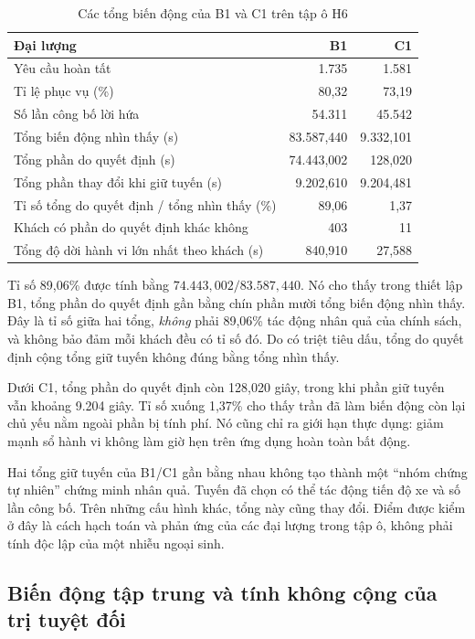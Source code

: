 \begin{table}[htbp]
\centering
\caption{Các tổng biến động của B1 và C1 trên tập ô H6}
\label{bang:quytrach}
\begin{tabularx}{\linewidth}{@{}Xrr@{}}
\toprule
\textbf{Đại lượng} & \textbf{B1} & \textbf{C1}\\
\midrule
Yêu cầu hoàn tất & 1.735 & 1.581\\
Tỉ lệ phục vụ (\%) & 80,32 & 73,19\\
Số lần công bố lời hứa & 54.311 & 45.542\\
Tổng biến động nhìn thấy (s) & 83.587,440 & 9.332,101\\
Tổng phần do quyết định (s) & 74.443,002 & 128,020\\
Tổng phần thay đổi khi giữ tuyến (s) & 9.202,610 & 9.204,481\\
Tỉ số tổng do quyết định / tổng nhìn thấy (\%) & 89,06 & 1,37\\
Khách có phần do quyết định khác không & 403 & 11\\
Tổng độ dời hành vi lớn nhất theo khách (s) & 840,910 & 27,588\\
\bottomrule
\end{tabularx}
\end{table}

Tỉ số 89,06\% được tính bằng $74.443{,}002/83.587{,}440$. Nó cho thấy trong thiết lập
B1, tổng phần do quyết định gần bằng chín phần mười tổng biến động nhìn thấy. Đây là tỉ
số giữa hai tổng, \emph{không} phải 89,06\% tác động nhân quả của chính sách, và không
bảo đảm mỗi khách đều có tỉ số đó. Do có triệt tiêu dấu, tổng do quyết định cộng tổng giữ
tuyến không đúng bằng tổng nhìn thấy.

Dưới C1, tổng phần do quyết định còn 128,020 giây, trong khi phần giữ tuyến vẫn khoảng
9.204 giây. Tỉ số xuống 1,37\% cho thấy trần đã làm biến động còn lại chủ yếu nằm ngoài
phần bị tính phí. Nó cũng chỉ ra giới hạn thực dụng: giảm mạnh sổ hành vi không làm giờ
hẹn trên ứng dụng hoàn toàn bất động.

Hai tổng giữ tuyến của B1/C1 gần bằng nhau không tạo thành một ``nhóm chứng tự nhiên''
chứng minh nhân quả. Tuyến đã chọn có thể tác động tiến độ xe và số lần công bố. Trên
những cấu hình khác, tổng này cũng thay đổi. Điểm được kiểm ở đây là cách hạch toán và
phản ứng của các đại lượng trong tập ô, không phải tính độc lập của một nhiễu ngoại sinh.

\subsection{Biến động tập trung và tính không cộng của trị tuyệt đối}

